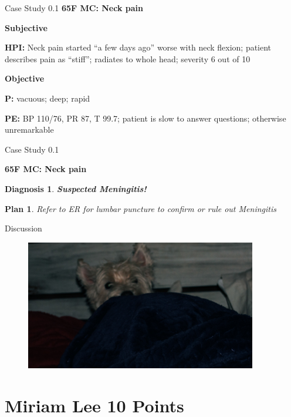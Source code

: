 \begin{frame}{Case Study 0.1} %
  \textbf{\Large 65F MC: Neck pain}
  
  \textbf{\large Subjective}
  
  \textbf{HPI:} Neck pain started ``a few days ago'' worse with neck flexion; patient describes pain as ``stiff''; radiates to whole head; severity 6 out of 10

  \textbf{\large Objective}
  
  \textbf{P:} vacuous; deep; rapid

  \textbf{PE:} BP 110/76, PR 87, T 99.7; patient is slow to answer questions; otherwise unremarkable

\end{frame}

\begin{frame}{Case Study 0.1} %
  \newtheorem{dx}{Diagnosis}
  \newtheorem{as}{Assessment}
  \newtheorem{pln}{Plan}
  \textbf{\Large 65F MC: Neck pain}

  \begin{dx}
    \textbf{Suspected Meningitis!}
  \end{dx}

  \begin{pln}
    Refer to ER for lumbar puncture to confirm or rule out Meningitis
  \end{pln}

\end{frame}
  
\begin{frame}{Discussion}
  \begin{figure}
    \centering
    \includegraphics[width=0.9\textwidth]{img/westie02.jpg}
  \end{figure}
\end{frame}

\section{Miriam Lee 10 Points}          

